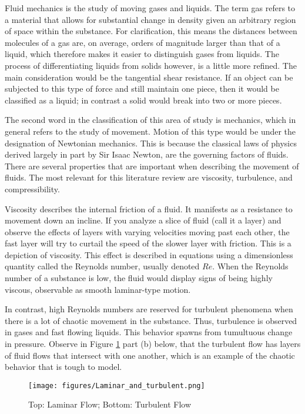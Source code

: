 \documentclass[undefended]{sfuthesis}
\begin{document}
Fluid mechanics is the study of moving gases and liquids. The term gas refers to a material that allows for substantial change in density given an arbitrary region of space within the substance. For clarification, this means the distances between molecules of a gas are, on average, orders of magnitude larger than that of a liquid, which therefore makes it easier to distinguish gases from liquids. The process of differentiating liquids from solids however, is a little more refined. The main consideration would be the tangential shear resistance. If an object can be subjected to this type of force and still maintain one piece, then it would be classified as a liquid; in contrast a solid would break into two or more pieces. 

The second word in the classification of this area of study is mechanics, which in general refers to the study of movement. Motion of this type would be under the designation of Newtonian mechanics. This is because the classical laws of physics derived largely in part by Sir Isaac Newton, are the governing factors of fluids. There are several properties that are important when describing the movement of fluids. The most relevant for this literature review are viscosity, turbulence, and compressibility.

Viscosity describes the internal friction of a fluid. It manifests as a resistance to movement down an incline. If you analyze a slice of fluid (call it a layer) and observe the effects of layers with varying velocities moving past each other, the fast layer will try to curtail the speed of the slower layer with friction. This is a depiction of viscosity. This effect is described in equations using a dimensionless quantity called the Reynolds number, usually denoted $Re$. When the Reynolds number of a substance is low, the fluid would display signs of being highly viscous, observable as smooth laminar-type motion. 

In contrast, high Reynolds numbers are reserved for turbulent phenomena when there is a lot of chaotic movement in the substance. Thus, turbulence is observed in gases and fast flowing liquids. This behavior spawns from tumultuous change in pressure. Observe in Figure \ref{fig:LaminarAndTurbulent} part (b) below, that the turbulent flow has layers of fluid flows that intersect with one another, which is an example of the chaotic behavior that is tough to model.
\begin{figure}[h!]
	\centering
	\texttt{[image: figures/Laminar\_and\_turbulent.png]}
	\caption{Top: Laminar Flow; Bottom: Turbulent Flow}
	\label{fig:LaminarAndTurbulent}
\end{figure}
\end{document}
